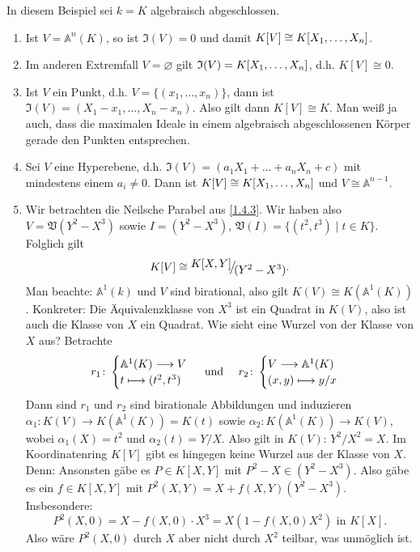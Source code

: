 \documentclass[a4paper,12pt]{scrbook}
\theoremstyle{blah}
\theoremstyle{stz}
\def\A{\mathbb{A}}
\def\V{\mathfrak{V}}
\def\I{\mathfrak{I}}
\newcommand{\ra}{\longrightarrow}
\newcommand{\leer}{\ensuremath{\varnothing}}
\renewcommand{\mapsto}{\longmapsto}
\newcommand{\Quotient}[2]{
  \raisebox{0.7ex}{\ensuremath{#1}}
  \ensuremath{\mkern-3mu}\big/\ensuremath{\mkern-3mu}
  \raisebox{-0.6ex}{\ensuremath{#2}}}
\newcommand{\polyx}[1][n]{\ensuremath%
  [X_{1},\dotsc,X_{#1}]}
\begin{document}
\begin{bsp}\label{1.4.8} In diesem Beispiel sei $k=K$ algebraisch abgeschlossen.
\begin{enumerate}
\item\label{1.4.8a} Ist $V=\A^n(K)$, so ist $\I(V)=0$ und damit $K[V]\cong K\polyx$.
\item\label{1.4.8b} Im anderen Extremfall $V=\leer$ gilt $\I(V)=K\polyx$, d.h. $K[V]\cong 0$.
\item\label{1.4.8c} Ist $V$ ein Punkt, d.h. $V=\{(x_1,\dotsc,x_n)\}$, dann ist $\I(V)=(X_1-x_1,\dotsc,X_n-x_n)$. Also gilt dann $K[V]\cong K$. Man weiß ja auch, dass die maximalen Ideale in einem algebraisch abgeschlossenen Körper gerade den Punkten entsprechen.
\item\label{1.4.8d} Sei $V$ eine Hyperebene, d.h. $\I(V)=(a_1X_1+\dotsc+a_nX_n+c)$ mit mindestens einem $a_i\neq 0$.
Dann ist $K[V]\cong K\polyx$ und $V\cong \A^{n-1}$.
\item\label{1.4.8e} Wir betrachten die Neilsche Parabel aus \autoref{1.4.3}. Wir haben also $V=\V(Y^2-X^3)$ sowie $I=(Y^2-X^3)$,
  $\V(I)=\{(t^2,t^3) \mid t\in K\}$. Folglich gilt
\[K[V]\cong \Quotient{K[X,Y]}{(Y^2-X^3)}.\] 
Man beachte: $\A^1(k)$ und $V$ sind birational, also gilt $K(V)\cong K(\A^1(K))$. Konkreter:
Die Äquivalenzklasse von $X^3$ ist ein Quadrat in $K(V)$, also ist auch die Klasse von $X$ ein Quadrat.
Wie sieht eine Wurzel von der Klasse von $X$ aus? Betrachte  
\[r_1\colon  \begin{cases} \A^1(K)\ra V \\ t\mapsto (t^2,t^3) \end{cases} \text{ und \quad  } r_2\colon  \begin{cases} V\ra \A^1(K) \\ (x,y) \mapsto y/x\end{cases}\]
Dann sind $r_1$ und $r_2$ sind birationale Abbildungen und induzieren $\alpha_1\colon  K(V)\ra K(\A^1(K))=K(t)$ sowie $\alpha_2\colon  K(\A^1(K))\ra K(V)$, wobei $\alpha_1(X)=t^2$ und $\alpha_2(t)=Y/X$. Also gilt in $K(V)$: $Y^2/X^2=X$.
Im Koordinatenring $K[V]$ gibt es hingegen keine Wurzel aus der Klasse von $X$. Denn:
Ansonsten gäbe es $P \in K[X,Y]$ mit $P^2-X \in (Y^2-X^3)$. Also gäbe es ein $f \in K[X,Y]$ mit $P^2(X,Y)=X+f(X,Y)(Y^2-X^3)$.
Insbesondere:
 \[P^2(X,0)=X-f(X,0)\cdot X^3=X(1-f(X,0)X^2)\text{ in } K[X].\]
 Also wäre $P^2(X,0)$ durch $X$ aber nicht durch $X^2$ teilbar, was unmöglich ist.
\end{enumerate}
\end{bsp}
\end{document}
